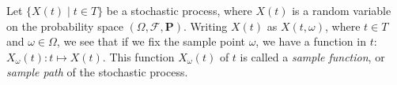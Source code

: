\documentclass[12pt]{article}
\begin{document}
Let $\lbrace X(t)\mid t\in T \rbrace$ be a stochastic process, where
$X(t)$ is a random variable on the probability space
$(\Omega,\mathcal{F},\textbf{P})$.  Writing $X(t)$ as $X(t,\omega)$,
where $t\in T$ and $\omega\in\Omega$, we see that if we fix the
sample point $\omega$, we have a function in $t$: $X_{\omega}(t)
\colon t\mapsto X(t)$. This function $X_{\omega}(t)$ of $t$ is
called a \emph{sample function}, or \emph{sample path} of the
stochastic process.
\end{document}
